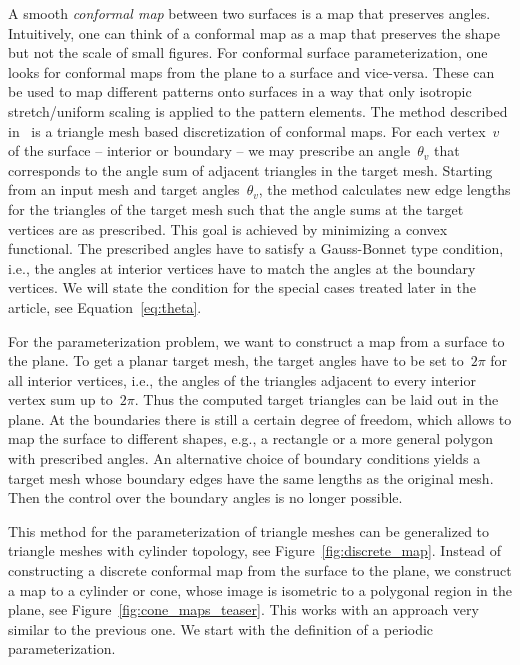 \documentclass[article.tex]{subfiles}
\begin{document}
A smooth \emph{conformal map} between two surfaces is a map that
preserves angles. Intuitively, one can think of a conformal map as a
map that preserves the shape but not the scale of small figures. For
conformal surface parameterization, one looks for conformal
maps from the plane to a surface and vice-versa. These can be used to 
map different patterns onto surfaces in a way that only isotropic
stretch/uniform scaling is applied to the pattern elements.
%
The method described in~\cite{SSP08} is a triangle mesh based
discretization of conformal maps. For each vertex~$v$ of
the surface -- interior or boundary -- we may prescribe an
angle~$\theta_v$ that corresponds to the angle sum of adjacent
triangles in the target mesh.  Starting from an input mesh and target
angles~$\theta_v$, the method calculates new edge lengths for the
triangles of the target mesh such that the angle sums at the target
vertices are as prescribed. This goal is achieved by minimizing a
convex functional.  
%
The prescribed angles have to satisfy a Gauss-Bonnet type condition,
i.e., the angles at interior vertices have to match the angles at the
boundary vertices.  We will state the condition for the special cases
treated later in the article, see Equation~\eqref{eq:theta}.

For the parameterization problem, we want to construct a map from a
surface to the plane. To get a planar target mesh, the target angles
have to be set to~$2\pi$ for all interior vertices, i.e., the angles
of the triangles adjacent to every interior vertex sum up
to~$2\pi$. Thus the computed target triangles can be laid out in the
plane. At the boundaries there is still a certain degree of freedom,
which allows to map the surface to different shapes, e.g., a rectangle
or a more general polygon with prescribed angles. 
%
An alternative choice of boundary conditions yields a target mesh
whose boundary edges have the same lengths as the original mesh. Then
the control over the boundary angles is no longer possible.

This method for the parameterization of triangle meshes can be generalized
to triangle meshes with cylinder topology, see Figure~\ref{fig:discrete_map}. 
Instead of constructing a discrete conformal map from the
surface to the plane, we construct a map to a cylinder or cone, whose image
is isometric to a polygonal region in the plane, see Figure~\ref{fig:cone_maps_teaser}. 
This works with an approach very similar to the previous one. We start 
with the definition of a periodic parameterization.
\end{document}
